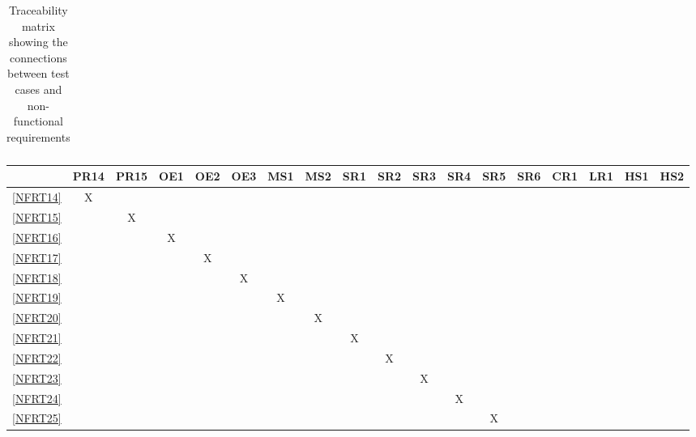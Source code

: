 \documentclass[12pt, titlepage]{article}
\begin{document}
\begin{landscape}
\begin{table}[h!]
\begin{tabular}{|c|c|c|c|c|c|c|c|c|c|c|c|c|c|c|c|c|}
    \end{tabular}
    \caption{Traceability matrix showing the connections between test cases
      and non-functional requirements}
    \label{tab:nfrt1}
  \end{table}
  \begin{table}[h!]
    \centering
    \begin{tabular}{|c|c|c|c|c|c|c|c|c|c|c|c|c|c|c|c|c|c|} \hline
                & PR14 & PR15 & OE1 & OE2 & OE3 & MS1 & MS2 & SR1 & SR2 & SR3 & SR4 & SR5 & SR6 & CR1 & LR1 & HS1 & HS2 \\ \hline
      \ref{NFRT14} & X    &      &     &     &     &     &     &     &     &     &     &     &     &     &     &     &     \\ \hline
      \ref{NFRT15} &      & X    &     &     &     &     &     &     &     &     &     &     &     &     &     &     &     \\ \hline
      \ref{NFRT16} &      &      & X   &     &     &     &     &     &     &     &     &     &     &     &     &     &     \\ \hline
      \ref{NFRT17} &      &      &     & X   &     &     &     &     &     &     &     &     &     &     &     &     &     \\ \hline
      \ref{NFRT18} &      &      &     &     & X   &     &     &     &     &     &     &     &     &     &     &     &     \\ \hline
      \ref{NFRT19} &      &      &     &     &     & X   &     &     &     &     &     &     &     &     &     &     &     \\ \hline
      \ref{NFRT20} &      &      &     &     &     &     & X   &     &     &     &     &     &     &     &     &     &     \\ \hline
      \ref{NFRT21} &      &      &     &     &     &     &     & X   &     &     &     &     &     &     &     &     &     \\ \hline
      \ref{NFRT22} &      &      &     &     &     &     &     &     & X   &     &     &     &     &     &     &     &     \\ \hline
      \ref{NFRT23} &      &      &     &     &     &     &     &     &     & X   &     &     &     &     &     &     &     \\ \hline
      \ref{NFRT24} &      &      &     &     &     &     &     &     &     &     & X   &     &     &     &     &     &     \\ \hline
      \ref{NFRT25} &      &      &     &     &     &     &     &     &     &     &     & X   &     &     &     &     &     \\ \hline

\end{tabular}
\end{table}
\end{landscape}
\end{document}
